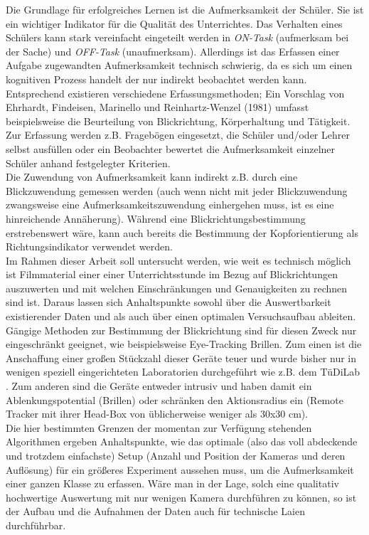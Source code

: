 \label{intension}
Die Grundlage für erfolgreiches Lernen ist die Aufmerksamkeit der Schüler. Sie ist ein wichtiger Indikator für die Qualität des Unterrichtes. Das Verhalten eines Schülers kann stark vereinfacht eingeteilt werden in \textit{ON-Task} (aufmerksam bei der Sache) und \textit{OFF-Task} (unaufmerksam). Allerdings ist das Erfassen einer Aufgabe zugewandten Aufmerksamkeit technisch schwierig, da es sich um einen kognitiven Prozess handelt der nur indirekt beobachtet werden kann. Entsprechend existieren verschiedene Erfassungsmethoden; Ein Vorschlag von Ehrhardt, Findeisen, Marinello und Reinhartz-Wenzel (1981) umfasst beispielsweise die Beurteilung von Blickrichtung, Körperhaltung und Tätigkeit.\\
Zur Erfassung werden z.B. Fragebögen eingesetzt, die Schüler und/oder Lehrer selbst ausfüllen oder ein Beobachter bewertet die Aufmerksamkeit einzelner Schüler anhand festgelegter Kriterien.\\
Die Zuwendung von Aufmerksamkeit kann indirekt z.B. durch eine Blickzuwendung gemessen werden (auch wenn nicht mit jeder Blickzuwendung zwangsweise eine Aufmerksamkeitszuwendung einhergehen muss, ist es eine hinreichende Annäherung). Während eine Blickrichtungsbestimmung erstrebenswert wäre, kann auch bereits die Bestimmung der Kopforientierung als Richtungsindikator verwendet werden.\\
Im Rahmen dieser Arbeit soll untersucht werden, wie weit es technisch möglich ist Filmmaterial einer einer Unterrichtsstunde im Bezug auf Blickrichtungen auszuwerten und mit welchen Einschränkungen und Genauigkeiten zu rechnen sind ist. Daraus lassen sich Anhaltspunkte sowohl über die Auswertbarkeit existierender Daten und als auch über einen optimalen Versuchsaufbau ableiten.\\
Gängige Methoden zur Bestimmung der Blickrichtung sind für diesen Zweck nur eingeschränkt geeignet, wie beispielsweise Eye-Tracking Brillen. Zum einen ist die Anschaffung einer großen Stückzahl dieser Geräte teuer und wurde bisher nur in wenigen speziell eingerichteten Laboratorien durchgeführt wie z.B. dem TüDiLab \cite{TueDiLab}. Zum anderen sind die Geräte entweder intrusiv und haben damit ein Ablenkungspotential (Brillen) oder schränken den Aktionsradius ein (Remote Tracker mit ihrer Head-Box von üblicherweise weniger als 30x30 cm).\\
Die hier bestimmten Grenzen der momentan zur Verfügung stehenden Algorithmen ergeben Anhaltspunkte, wie das optimale (also das voll abdeckende und trotzdem einfachste) Setup (Anzahl und Position der Kameras und deren Auflösung) für ein größeres Experiment aussehen muss, um die Aufmerksamkeit einer ganzen Klasse zu erfassen. Wäre man in der Lage, solch eine qualitativ hochwertige Auswertung mit nur wenigen Kamera durchführen zu können, so ist der Aufbau und die Aufnahmen der Daten auch für technische Laien durchführbar.\\
